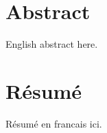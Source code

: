 \begingroup
\let\clearpage\relax
\let\cleardoublepage\relax
\let\cleardoublepage\relax

\chapter*{Abstract}

English abstract here.

\endgroup

\cleardoublepage%

\begingroup
\let\clearpage\relax
\let\cleardoublepage\relax
\let\cleardoublepage\relax

\chapter*{Résumé}

Résumé en francais ici.


\endgroup

\vfill